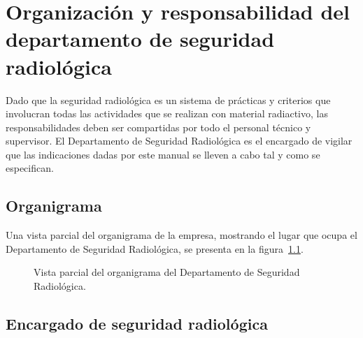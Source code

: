 \chapter[Organización y responsabilidad]{Organización y responsabilidad del departamento de seguridad radiológica}

Dado que la seguridad radiológica es un sistema de prácticas y criterios que involucran todas las actividades que se realizan con material radiactivo, las responsabilidades deben ser compartidas por todo el personal técnico y supervisor. El Departamento de Seguridad Radiológica es el encargado de vigilar que las indicaciones dadas por este manual se lleven a cabo tal y como se especifican.

\section{Organigrama}

Una vista parcial del organigrama de la empresa, mostrando el lugar que ocupa el Departamento de Seguridad Radiológica, se presenta en la figura~\ref{fig:organigrama-seguridad}.

\begin{figure}[htbp]
  \centering
  \caption{Vista parcial del organigrama del Departamento de Seguridad Radiológica.}
  \label{fig:organigrama-seguridad}
\end{figure}

\section{Encargado de seguridad radiológica}

